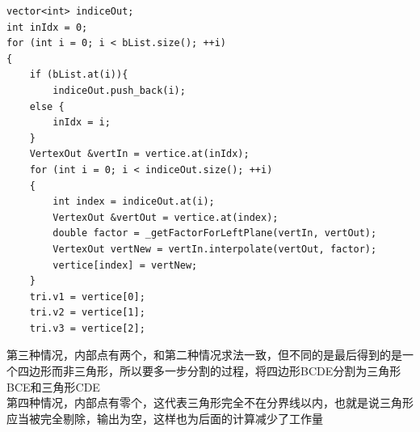     \begin{lstlisting}
vector<int> indiceOut;
int inIdx = 0;
for (int i = 0; i < bList.size(); ++i)
{
	if (bList.at(i)){
		indiceOut.push_back(i);
	else {
		inIdx = i;
	}
    VertexOut &vertIn = vertice.at(inIdx);
    for (int i = 0; i < indiceOut.size(); ++i)
    {
        int index = indiceOut.at(i);
        VertexOut &vertOut = vertice.at(index);
        double factor = _getFactorForLeftPlane(vertIn, vertOut);
        VertexOut vertNew = vertIn.interpolate(vertOut, factor);
        vertice[index] = vertNew;
    }
    tri.v1 = vertice[0];
    tri.v2 = vertice[1];
    tri.v3 = vertice[2];
	\end{lstlisting}
\begin{spacing}{2.5}
第三种情况，内部点有两个，和第二种情况求法一致，但不同的是最后得到的是一个四边形而非三角形，所以要多一步分割的过程，将四边形BCDE分割为三角形BCE和三角形CDE\\

第四种情况，内部点有零个，这代表三角形完全不在分界线以内，也就是说三角形应当被完全剔除，输出为空，这样也为后面的计算减少了工作量\\
		
    \end{spacing}
    \begin{spacing}{2.5}

    \end{spacing}
    \begin{spacing}{2.5}
    	
    \end{spacing}

